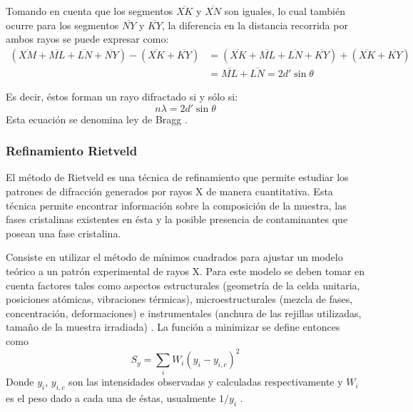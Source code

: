 \documentclass[../main.tex]{subfiles}
\begin{document}
Tomando en cuenta que los segmentos $\overline{XK}$ y $\overline{XN}$ son iguales, lo cual también ocurre para los segmentos $\overline{NY}$ y $\overline{KY}$, la diferencia en la distancia recorrida por ambos rayos se puede expresar como:
\begin{equation}
    \begin{split}
        (\overline{XM}+\overline{ML}+\overline{LN}+\overline{NY})-(\overline{XK}+\overline{KY})&=(\overline{XK}+\overline{ML}+\overline{LN}+\overline{KY})+(\overline{XK}+\overline{KY})\\
        &=\overline{ML}+\overline{LN}=2d'\sin{\theta}
    \end{split}
    \label{eq:rayosbragg}
\end{equation}

Es decir, éstos forman un rayo difractado si y sólo si:
\begin{equation}
    n\lambda=2d'\sin{\theta}
    \label{eq:leydebragg}
\end{equation}
Esta ecuación se denomina ley de Bragg \cite{Cullity2014}.
\subsubsection{Refinamiento Rietveld}
El método de Rietveld es una técnica de refinamiento que permite estudiar los patrones de difracción generados por rayos X de manera cuantitativa. Esta técnica permite encontrar información sobre la composición de la muestra, las fases cristalinas existentes en ésta y la posible presencia de contaminantes que posean una fase cristalina.

Consiste en utilizar el método de mínimos cuadrados para ajustar un modelo teórico a un patrón experimental de rayos X. Para este modelo se deben tomar en cuenta factores tales como aspectos estructurales (geometría de la celda unitaria, posiciones atómicas, vibraciones térmicas), microestructurales (mezcla de fases, concentración, deformaciones) e instrumentales (anchura de las rejillas utilizadas, tamaño de la muestra irradiada) \cite{Rietveld}. La función a minimizar se define entonces como
\begin{equation}
    S_y=\sum_i W_i\left(y_{i}-y_{i,c}\right)^2
    \label{eq:minimcuad}
\end{equation}
Donde $y_{i}$, $y_{i,c}$ son las intensidades observadas y calculadas respectivamente y $W_i$ es el peso dado a cada una de éstas, usualmente $1/y_i$ \cite{Fuentes2004}.
\end{document}
